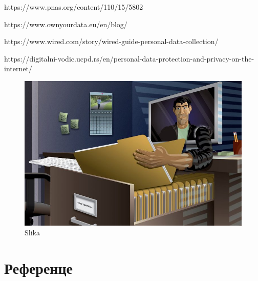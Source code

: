 \documentclass[a4paper]{article}
\begin{document}
https://www.pnas.org/content/110/15/5802

https://www.ownyourdata.eu/en/blog/

https://www.wired.com/story/wired-guide-personal-data-collection/

https://digitalni-vodic.ucpd.rs/en/personal-data-protection-and-privacy-on-the-internet/


\begin{figure}[h!]
\begin{center}
\includegraphics[scale=0.3]{slika.jpg}
\end{center}
\caption{Slika}
\label{fig:}
\end{figure}

\section{Референце}
\end{document}
